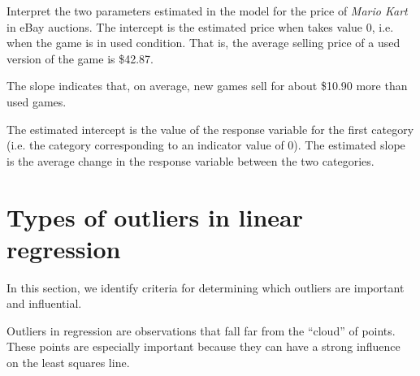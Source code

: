 \begin{example}{Interpret the two parameters estimated in the model for the price of \emph{Mario Kart} in eBay auctions.}
The intercept is the estimated price when  takes value 0, i.e. when the game is in used condition. That is, the average selling price of a used version of the game is \$42.87.

The slope indicates that, on average, new games sell for about \$10.90 more than used games.
\end{example}

\begin{tipBox}{
The estimated intercept is the value of the response variable for the first category (i.e. the category corresponding to an indicator value of 0). The estimated slope is the average change in the response variable between the two categories.}
\end{tipBox}



\section{Types of outliers in linear regression}
\label{typesOfOutliersInLinearRegression}

In this section, we identify criteria for determining which outliers are important and influential.

Outliers in regression are observations that fall far from the ``cloud'' of points. These points are especially important because they can have a strong influence on the least squares line. 

